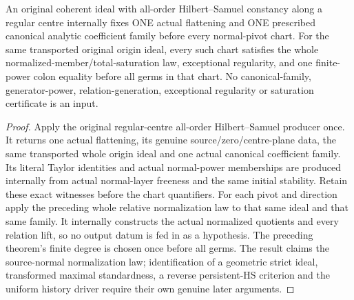 \begin{theorem}
\label{hir:actual-original-hs-centre-normalized-total-saturation}
\leanok
An original coherent ideal with all-order Hilbert--Samuel constancy along a
regular centre internally fixes ONE actual flattening and ONE prescribed
canonical analytic coefficient family before every normal-pivot chart.
For the same transported original origin ideal, every such chart satisfies
the whole normalized-member/total-saturation law, exceptional regularity,
and one finite-power colon equality before all germs in that chart.
No canonical-family, generator-power, relation-generation, exceptional
regularity or saturation certificate is an input.
\end{theorem}
\begin{proof}
Apply the original regular-centre all-order Hilbert--Samuel producer once.
It returns one actual flattening, its genuine source/zero/centre-plane data,
the same transported whole origin ideal and one actual canonical coefficient
family. Its literal Taylor identities and actual normal-power memberships
are produced internally from actual normal-layer freeness and the same
initial stability. Retain these exact witnesses before the chart quantifiers.
For each pivot and direction apply the preceding whole relative normalization
law to that same ideal and that same family. It internally constructs the
actual normalized quotients and every relation lift, so no output datum is
fed in as a hypothesis. The preceding theorem's finite degree is chosen once
before all germs. The result claims the source-normal normalization law;
identification of a geometric strict ideal, transformed maximal standardness,
a reverse persistent-HS criterion and the uniform history driver require their
own genuine later arguments.
\end{proof}
